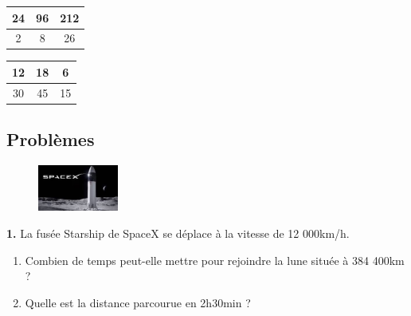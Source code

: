 \begin{multicols}{2}
  \begin{center}
    \begin{tabular}{|c|c|c|}
      \hline
      24 & 96 & 212 \\  \hline
      2 & 8 & 26\\  \hline
    \end{tabular}
  \end{center}
  \begin{center}
    \begin{tabular}{|c|c|c|}
      \hline
      12 & 18 & 6 \\  \hline
      30 & 45 & 15\\  \hline
    \end{tabular}
  \end{center}
\end{multicols}

\Pointilles[6]


\subsection*{Problèmes}

\begin{minipage}[t]{0.25\textwidth}
  \begin{figure}[H]
    \centering
    \includegraphics[width=100px]{4x3-proportionnalite/ex1.jpg}
  \end{figure}
\end{minipage}
\begin{minipage}[t]{0.75\textwidth}
\textbf{1.} La fusée Starship de SpaceX se déplace à la vitesse de 12 000km/h. 

\begin{enumerate}
  \item[1.] Combien de temps peut-elle mettre pour rejoindre la lune située à 384 400km ? 
  \item[2.] Quelle est la distance parcourue en 2h30min ? 
\end{enumerate}

\Pointilles[2]
\end{minipage}

\Pointilles[6]

\newpage

